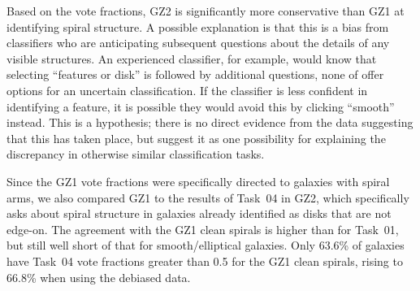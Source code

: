 \documentclass[useAMS,usenatbib]{mn2e}
\begin{document}
Based on the vote fractions, GZ2 is significantly more conservative than GZ1 at identifying spiral structure. A possible explanation is that this is a bias from classifiers who are anticipating subsequent questions about the details of any visible structures. An experienced classifier, for example, would know that selecting ``features or disk'' is followed by additional questions, none of offer options for an uncertain classification. If the classifier is less confident in identifying a feature, it is possible they would avoid this by clicking ``smooth'' instead. This is a hypothesis; there is no direct evidence from the data suggesting that this has taken place, but suggest it as one possibility for explaining the discrepancy in otherwise similar classification tasks. %

Since the GZ1 vote fractions were specifically directed to galaxies with spiral arms, we also compared GZ1 to the results of Task~04 in GZ2, which specifically asks about spiral structure in galaxies already identified as disks that are not edge-on. The agreement with the GZ1 clean spirals is higher than for Task~01, but still well short of that for smooth/elliptical galaxies. Only 63.6\% of galaxies have Task~04 vote fractions greater than 0.5 for the GZ1 clean spirals, rising to 66.8\% when using the debiased data. 

\end{document}
